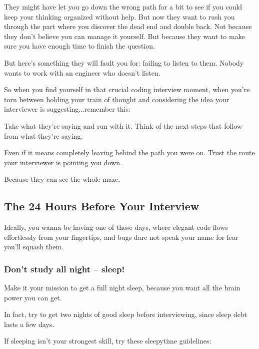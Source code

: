 \documentclass{article}
\begin{document}
They might have let you go down the wrong path for a bit to see if you could keep your thinking organized without help. But now they want to rush you through the part where you discover the dead end and double back. Not because they don't believe you can manage it yourself. But because they want to make sure you have enough time to finish the question.

But here's something they will fault you for: failing to listen to them. Nobody wants to work with an engineer who doesn't listen.

So when you find yourself in that crucial coding interview moment, when you're torn between holding your train of thought and considering the idea your interviewer is suggesting...remember this:


Take what they're saying and run with it. Think of the next steps that follow from what they're saying.

Even if it means completely leaving behind the path you were on. Trust the route your interviewer is pointing you down.

Because they can see the whole maze.


\subsection{The 24 Hours Before Your Interview}

Ideally, you wanna be having one of those days, where elegant code flows effortlessly from your fingertips, and bugs dare not speak your name for fear you'll squash them.


\subsubsection{Don't study all night -- sleep!}

Make it your mission to get a full night sleep, because you want all the brain power you can get.


In fact, try to get two nights of good sleep before interviewing, since sleep debt lasts a few days.


 If sleeping isn't your strongest skill, try these sleepytime guidelines:
\end{document}
